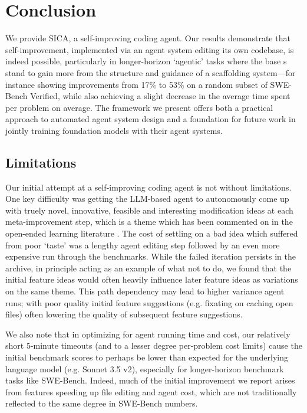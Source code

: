 \section{Conclusion}
\label{sec:conclusion}

We provide SICA, a self-improving coding agent.
Our results demonstrate that self-improvement, implemented via an agent system
editing its own codebase, is indeed possible, particularly in longer-horizon
`agentic' tasks where the base s stand to gain more from the structure
and guidance of a scaffolding system---for instance showing improvements from
17\% to 53\% on a random subset of SWE-Bench Verified, while also achieving a
slight decrease in the average time spent per problem on average.
The framework we present offers both a practical approach to automated
agent system design and a foundation for future work in jointly training
foundation models with their agent systems.
\subsection{Limitations}
\label{sec:limitations}

Our initial attempt at a self-improving coding agent is not without
limitations. One key difficulty was getting the LLM-based agent to autonomously
come up with truely novel, innovative, feasible and interesting modification
ideas at each meta-improvement step, which is a theme which has been commented
on in the open-ended learning literature
\citep{nathaniMLGymNewFramework2025,yamadaAIScientistv2WorkshopLevel2025,hughesOpenEndednessEssentialArtificial2024}.
The cost of settling on a bad idea which suffered from poor `taste' was a
lengthy agent editing step followed by an even more expensive run through the
benchmarks. While the failed iteration persists in the archive, in principle
acting as an example of what not to do, we found that the initial feature ideas
would often heavily influence later feature ideas as variations on the same
theme. This path dependency may lead to higher variance agent runs; with poor
quality initial feature suggestions (e.g. fixating on caching open files)
often lowering the quality of subsequent feature suggestions.

We also note that in optimizing for agent running time and cost, our relatively
short 5-minute timeouts (and to a lesser degree per-problem cost limits) cause
the initial benchmark scores to perhaps be lower than expected for the
underlying language model (e.g. Sonnet 3.5 v2), especially for longer-horizon
benchmark tasks like SWE-Bench. Indeed, much of the initial improvement we report
arises from features speeding up file editing and agent cost, which are not
traditionally reflected to the same degree in SWE-Bench numbers.

